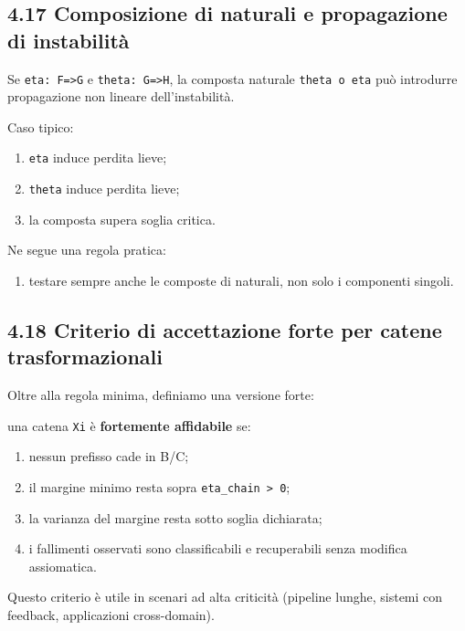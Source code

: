 \subsection{4.17 Composizione di naturali e propagazione di instabilità}

Se \texttt{eta:\ F=\textgreater{}G} e \texttt{theta:\ G=\textgreater{}H}, la composta naturale \texttt{theta\ o\ eta} può introdurre propagazione non lineare dell'instabilità.

Caso tipico:

\begin{enumerate}
\def\labelenumi{\arabic{enumi}.}
\tightlist
\item
  \texttt{eta} induce perdita lieve;
\item
  \texttt{theta} induce perdita lieve;
\item
  la composta supera soglia critica.
\end{enumerate}

Ne segue una regola pratica:

\begin{enumerate}
\def\labelenumi{\arabic{enumi}.}
\tightlist
\item
  testare sempre anche le composte di naturali, non solo i componenti singoli.
\end{enumerate}

\subsection{4.18 Criterio di accettazione forte per catene trasformazionali}

Oltre alla regola minima, definiamo una versione forte:

una catena \texttt{Xi} è \textbf{fortemente affidabile} se:

\begin{enumerate}
\def\labelenumi{\arabic{enumi}.}
\tightlist
\item
  nessun prefisso cade in B/C;
\item
  il margine minimo resta sopra \texttt{eta\_chain\ \textgreater{}\ 0};
\item
  la varianza del margine resta sotto soglia dichiarata;
\item
  i fallimenti osservati sono classificabili e recuperabili senza modifica assiomatica.
\end{enumerate}

Questo criterio è utile in scenari ad alta criticità (pipeline lunghe, sistemi con feedback, applicazioni cross-domain).

